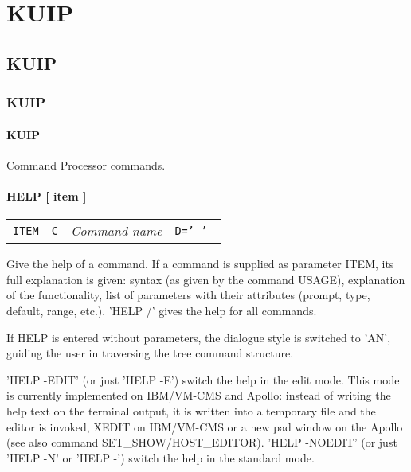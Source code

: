 \newcommand{\DEFMENU}[2]{
  \ifcase#1 \chapter{#2}
  \or \section{#2}
  \or \subsection{#2}
  \else \subsubsection{#2}
  \fi
}
\newcommand{\DEFCMD}[4]{
  \subsubsection{#3 #4\label{#1}\index{#3}\index{#2/#3}}}
\newcommand{\BEGARG}{
  \begin{tabular}{llll}}
\newcommand{\DEFARG}[4]{
  {\tt #1}&{\tt #3}&{\em #2}&{\tt #4}\\}
\newcommand{\ENDARG}{\end{tabular}\par}
\newcommand{\BEGTEXT}{\par}
\newcommand{\ENDTEXT}{}


\DEFMENU{0}{KUIP}
\BEGTEXT
Command Processor commands.
\ENDTEXT

\DEFCMD{K0HELP}{/KUIP}{HELP}{[ item ]}
\BEGARG
\DEFARG{ITEM}{Command name}{C}{D=' ' }
\ENDARG
\BEGTEXT
Give the help of a command.
If a command is supplied as parameter ITEM, its full explanation is given:
syntax (as given by the command USAGE), explanation of the functionality,
list of parameters with their attributes (prompt, type, default, range, etc.).
'HELP /' gives the help for all commands.

If HELP is entered without parameters, the dialogue style is switched
to 'AN', guiding the user in traversing the tree command structure.

'HELP -EDIT' (or just 'HELP -E') switch the help in the edit mode.
This mode is currently implemented on IBM/VM-CMS and Apollo:
instead of writing the help text on the terminal output,
it is written into a temporary file and the editor is invoked,
XEDIT on IBM/VM-CMS or a new pad window on the Apollo
(see also command SET\_SHOW/HOST\_EDITOR).
'HELP -NOEDIT' (or just 'HELP -N' or 'HELP -') switch the help in
the standard mode.
\ENDTEXT

